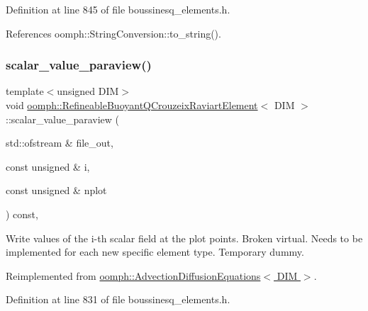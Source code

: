 Definition at line 845 of file boussinesq\+\_\+elements.\+h.



References oomph\+::\+String\+Conversion\+::to\+\_\+string().

\mbox{\label{classoomph_1_1RefineableBuoyantQCrouzeixRaviartElement_a9a8ee12b27daa327e97fbacc89c341c6}} 
\subsubsection{\texorpdfstring{scalar\+\_\+value\+\_\+paraview()}{scalar\_value\_paraview()}}
{\footnotesize\ttfamily template$<$unsigned D\+IM$>$ \\
void \hyperlink{classoomph_1_1RefineableBuoyantQCrouzeixRaviartElement}{oomph\+::\+Refineable\+Buoyant\+Q\+Crouzeix\+Raviart\+Element}$<$ D\+IM $>$\+::scalar\+\_\+value\+\_\+paraview (\begin{DoxyParamCaption}\item[{std\+::ofstream \&}]{file\+\_\+out,  }\item[{const unsigned \&}]{i,  }\item[{const unsigned \&}]{nplot }\end{DoxyParamCaption}) const\hspace{0.3cm}{\ttfamily [inline]}, {\ttfamily [virtual]}}



Write values of the i-\/th scalar field at the plot points. Broken virtual. Needs to be implemented for each new specific element type. Temporary dummy. 



Reimplemented from \hyperlink{classoomph_1_1AdvectionDiffusionEquations_a7e4c60334ef457e6155e84a9d24062cf}{oomph\+::\+Advection\+Diffusion\+Equations$<$ D\+I\+M $>$}.



Definition at line 831 of file boussinesq\+\_\+elements.\+h.

\mbox{\label{classoomph_1_1RefineableBuoyantQCrouzeixRaviartElement_ac6a973ee5e4d7425db2e7f9a259bab46}} 
